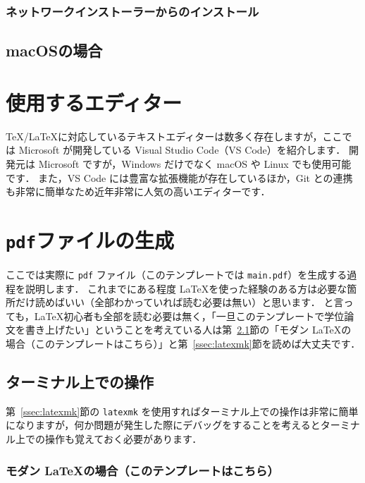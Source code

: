 \subsubsection*{ネットワークインストーラーからのインストール}


\subsection{macOSの場合}
\label{ssec:mac}



\section{使用するエディター}
\label{sec:editor}

\TeX/\LaTeX に対応しているテキストエディターは数多く存在しますが，ここでは Microsoft が開発している Visual Studio Code（VS Code）を紹介します．
開発元は Microsoft ですが，Windows だけでなく macOS や Linux でも使用可能です．
また，VS Code には豊富な拡張機能が存在しているほか，Git との連携も非常に簡単なため近年非常に人気の高いエディターです．

\section{\texttt{pdf}ファイルの生成}
\label{sec:makepdf}

ここでは実際に \verb|pdf| ファイル（このテンプレートでは \verb|main.pdf|）を生成する過程を説明します．
これまでにある程度 \LaTeX を使った経験のある方は必要な箇所だけ読めばいい（全部わかっていれば読む必要は無い）と思います．
と言っても，\LaTeX 初心者も全部を読む必要は無く，「一旦このテンプレートで学位論文を書き上げたい」ということを考えている人は第~\ref{ssec:terminal}節の「モダン \LaTeX の場合（このテンプレートはこちら）」と第~\ref{ssec:latexmk}節を読めば大丈夫です．

\subsection{ターミナル上での操作}
\label{ssec:terminal}

第~\ref{ssec:latexmk}節の \verb|latexmk| を使用すればターミナル上での操作は非常に簡単になりますが，何か問題が発生した際にデバッグをすることを考えるとターミナル上での操作も覚えておく必要があります．

\subsubsection*{モダン \LaTeX の場合（このテンプレートはこちら）}

